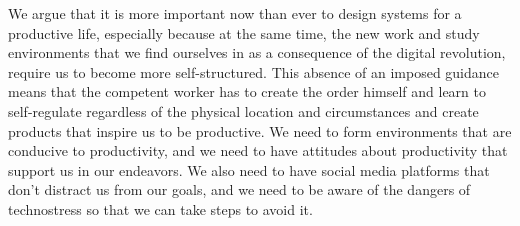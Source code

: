 We argue that it is more important now than ever to design systems for a productive life, especially
because at the same time, the new work and study environments that we find ourselves in as a consequence of the
digital revolution, require us to become more self-structured. This absence of an imposed guidance means that the competent worker has to create the order himself and learn to self-regulate \cite{Piers2007}
regardless of the physical location and circumstances and create
products that inspire us to be productive. We need to form
environments that are conducive to productivity,
and we need to have attitudes about productivity that support us in our endeavors.
We also need to have social media platforms that don't distract us from our goals,
and we need to be aware of the dangers of technostress so that we can take steps to avoid it.
